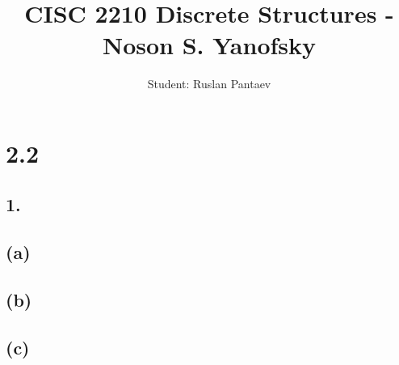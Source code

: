 \documentclass[11pt]{article}
\begin{document}
\title{CISC 2210 Discrete Structures - Noson S. Yanofsky}
\author{Student: Ruslan Pantaev}
\maketitle

\section*{2.2}
%
%
\subsection*{1.}
\begin{center}

\end{center}

\subsection*{(a)}
\begin{center}

\hfill \break

\end{center}

\subsection*{(b)}
\begin{center}

\hfill \break

\end{center}

\subsection*{(c)}
\begin{center}

\hfill \break

\end{center}
%
%
\end{document}
